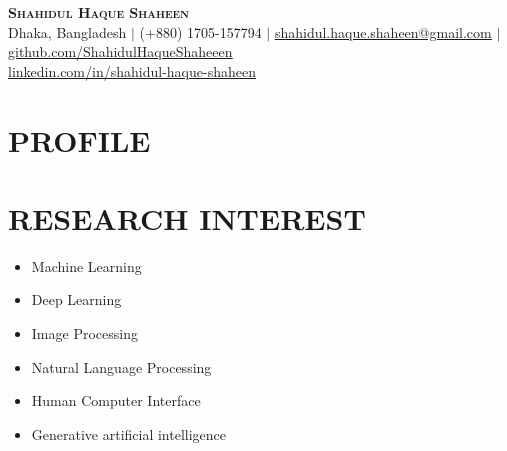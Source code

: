 \documentclass[letterpaper,11pt]{article}
\begin{document}
\begin{center}
    \textbf{\Huge \scshape Shahidul Haque Shaheen} \\ \vspace{1pt}
    \small Dhaka, Bangladesh $|$ (+880) 1705-157794  $|$ \href{mailto:shahidul.haque.shaheen@gmail.com}{\underline{shahidul.haque.shaheen@gmail.com}} $|$
    \href{https://github.com/ShahidulHaqueShaheeen}{\underline{github.com/ShahidulHaqueShaheeen}} \\ \vspace{1pt}
    \href{https://www.linkedin.com/in/shahidul-haque-shaheen/}{\underline{linkedin.com/in/shahidul-haque-shaheen}}
\end{center}



\section{\textbf{PROFILE}}


\section*{\textbf{RESEARCH INTEREST}}
\begin{minipage}[t]{0.33\textwidth}
  \begin{itemize}[left=0cm]
    \setlength\itemsep{-0.075em} %
    \setlength\parskip{-0.075em} %
    \item Machine Learning
    \item Deep Learning
  \end{itemize}
\end{minipage}%
\begin{minipage}[t]{0.33\textwidth}
  \begin{itemize}[left=0cm]
    \setlength\itemsep{-0.075em} %
    \setlength\parskip{-0.075em} %
    \item Image Processing
    \item Natural Language Processing
  \end{itemize}
\end{minipage}%
\begin{minipage}[t]{0.33\textwidth}
  \begin{itemize}[left=0cm]
    \setlength\itemsep{-0.075em} %
    \setlength\parskip{-0.075em}
    \item Human Computer Interface
    \item Generative artificial intelligence
  \end{itemize}
\end{minipage}
\end{document}
